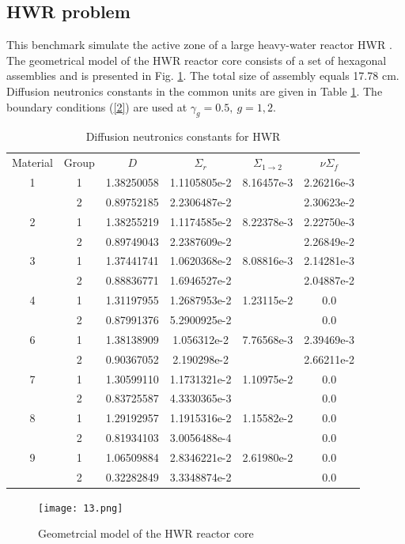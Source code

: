 \documentclass[authoryear]{elsarticle}
\begin{document}
\subsection{HWR problem}
This benchmark simulate the active zone of a large heavy-water reactor HWR \cite{chao}. The geometrical model of the HWR reactor core consists of a set of hexagonal assemblies and is presented in Fig. \ref{fig:13}. The total size of assembly equals 17.78 cm. Diffusion neutronics constants in the common units are given in Table \ref{t-5}. 
The boundary conditions (\ref{2}) are used at $\gamma_g = 0.5, \ g = 1,2$. 
\begin{table}[!h]
\small
\caption{Diffusion neutronics constants for HWR}
\label{t-5}
\begin{center}
\begin{tabular}{cccccc}
\rowcolor{col1}
Material & Group & $D$ & $\Sigma_r$ & $\Sigma_{1\to 2}$ & $\nu\Sigma_f$\\
\rowcolor{col3}
1 & 1 & 1.38250058 & 1.1105805e-2 & 8.16457e-3 & 2.26216e-3 \\
\rowcolor{col2}
  & 2 & 0.89752185 & 2.2306487e-2 &            & 2.30623e-2 \\
\rowcolor{col3}
2 & 1 & 1.38255219 & 1.1174585e-2 & 8.22378e-3 & 2.22750e-3 \\
\rowcolor{col2}
  & 2 & 0.89749043 & 2.2387609e-2 &            & 2.26849e-2 \\
\rowcolor{col3}
3 & 1 & 1.37441741 & 1.0620368e-2 & 8.08816e-3 & 2.14281e-3 \\
\rowcolor{col2}
  & 2 & 0.88836771 & 1.6946527e-2 &            & 2.04887e-2 \\
\rowcolor{col3}
4 & 1 & 1.31197955 & 1.2687953e-2 & 1.23115e-2 & 0.0 \\
\rowcolor{col2}
  & 2 & 0.87991376 & 5.2900925e-2 &            & 0.0 \\
\rowcolor{col3}
6 & 1 & 1.38138909 & 1.056312e-2 & 7.76568e-3 & 2.39469e-3 \\
\rowcolor{col2}
  & 2 & 0.90367052 & 2.190298e-2 &            & 2.66211e-2 \\
\rowcolor{col3}
7 & 1 & 1.30599110 & 1.1731321e-2 & 1.10975e-2 & 0.0 \\
\rowcolor{col2}
  & 2 & 0.83725587 & 4.3330365e-3 &            & 0.0 \\
\rowcolor{col3}
8 & 1 & 1.29192957 & 1.1915316e-2 & 1.15582e-2 & 0.0 \\
\rowcolor{col2}
  & 2 & 0.81934103 & 3.0056488e-4 &            & 0.0 \\
\rowcolor{col3}
9 & 1 & 1.06509884 & 2.8346221e-2 & 2.61980e-2 & 0.0 \\
\rowcolor{col3}
  & 2 & 0.32282849 & 3.3348874e-2 &            & 0.0 \\  
\end{tabular}
\end{center}
\end{table}
\begin{figure}[!h]
  \begin{center}
    \texttt{[image: 13.png]}
	\caption{Geometrcial model of the HWR reactor core}
	\label{fig:13}
  \end{center}
\end{figure} 
\end{document}
